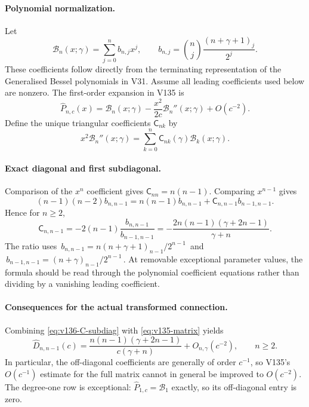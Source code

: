 \documentclass[11pt]{article}
\begin{document}
\paragraph{Polynomial normalization.}
Let
\[
 \mathcal B_n(x;\gamma)=\sum_{j=0}^n b_{n,j}x^j,
 \qquad b_{n,j}=\binom nj\frac{(n+\gamma+1)_j}{2^j}.
\]
These coefficients follow directly from the terminating representation
of the Generalised Bessel polynomials in V31. Assume all leading
coefficients used below are nonzero. The first-order expansion in V135 is
\[
 \widehat P_{n,c}(x)=\mathcal B_n(x;\gamma)
 -\frac{x^2}{2c}\mathcal B_n''(x;\gamma)+O(c^{-2}).
\]
Define the unique triangular coefficients $\mathsf C_{nk}$ by
\[
 x^2\mathcal B_n''(x;\gamma)
 =\sum_{k=0}^n\mathsf C_{nk}(\gamma)\mathcal B_k(x;\gamma).
\]

\paragraph{Exact diagonal and first subdiagonal.}
Comparison of the $x^n$ coefficient gives
$\mathsf C_{nn}=n(n-1)$. Comparing $x^{n-1}$ gives
\[
 (n-1)(n-2)b_{n,n-1}
 =n(n-1)b_{n,n-1}+\mathsf C_{n,n-1}b_{n-1,n-1}.
\]
Hence for $n\ge2$,
\begin{equation}\label{eq:v136-C-subdiag}
 \boxed{\mathsf C_{n,n-1}
 =-2(n-1)\frac{b_{n,n-1}}{b_{n-1,n-1}}
 =-\frac{2n(n-1)(\gamma+2n-1)}{\gamma+n}.}
\end{equation}
The ratio uses
$\,b_{n,n-1}=n(n+\gamma+1)_{n-1}/2^{n-1}\,$ and
$\,b_{n-1,n-1}=(n+\gamma)_{n-1}/2^{n-1}\,$.
At removable exceptional parameter values, the formula should be read
through the polynomial coefficient equations rather than dividing by a
vanishing leading coefficient.

\paragraph{Consequences for the actual transformed connection.}
Combining \eqref{eq:v136-C-subdiag} with \eqref{eq:v135-matrix} yields
\begin{equation}\label{eq:v136-D-subdiag}
 \boxed{\widehat D_{n,n-1}(c)
 =\frac{n(n-1)(\gamma+2n-1)}{c(\gamma+n)}
 +O_{n,\gamma}(c^{-2}),\qquad n\ge2.}
\end{equation}
In particular, the off-diagonal coefficients are generally of order
$c^{-1}$, so V135's $O(c^{-1})$ estimate for the full matrix cannot in
general be improved to $O(c^{-2})$. The degree-one row is exceptional:
$\widehat P_{1,c}=\mathcal B_1$ exactly, so its off-diagonal entry is zero.
\end{document}
